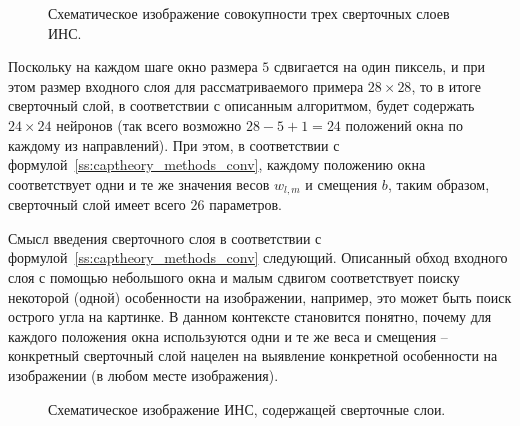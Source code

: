 \documentclass[a4paper,12pt,russian]{article} %
\begin{document}
\begin{figure}[t!]
	\caption{
		Схематическое изображение совокупности трех сверточных слоев ИНС.
        }
        \label{fig:nn_conv_layers}
\end{figure}

Поскольку на каждом шаге окно размера $5$ сдвигается на один пиксель, и при этом размер входного слоя для рассматриваемого примера $28 \times 28$, то в итоге сверточный слой, в соответствии с описанным алгоритмом, будет содержать $24 \times 24$ нейронов (так всего возможно $28-5+1=24$ положений окна по каждому из направлений).
При этом, в соответствии с формулой~\eqref{ss:captheory_methods_conv}, каждому положению окна соответствует одни и те же значения весов $w_{l,m}$ и смещения $b$, таким образом, сверточный слой имеет всего $26$ параметров.

Смысл введения сверточного слоя в соответствии с формулой~\eqref{ss:captheory_methods_conv} следующий.
Описанный обход входного слоя с помощью небольшого окна и малым сдвигом соответствует поиску некоторой (одной) особенности на изображении, например, это может быть поиск острого угла на картинке.
В данном контексте становится понятно, почему для каждого положения окна используются одни и те же веса и смещения -- конкретный сверточный слой нацелен на выявление конкретной особенности на изображении (в любом месте изображения).

\begin{figure}[t!]
	\caption{
		Схематическое изображение ИНС, содержащей сверточные слои.
        }
        \label{fig:nn_conv_net}
\end{figure}
\end{document}

